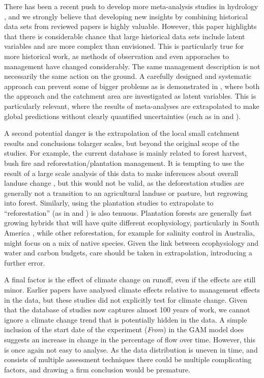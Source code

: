 \documentclass[]{elsarticle} %
\begin{document}
There has been a recent push to develop more meta-analysis studies in hydrology \citep{wang2020, evaristo2020metaanalysis}, and we strongly believe that developing new insights by combining historical data sets from reviewed papers is highly valuable. However, this paper highlights that there is considerable chance that large historical data sets include latent variables and are more complex than envisioned. This is particularly true for more historical work, as methods of observation and even apporaches to management have changed considerably. The same management description is not necessarily the same action on the ground. A carefully designed and systematic approach can prevent some of bigger problems as is demonstrated in \citet{wang2020}, where both the approach and the catchment area are investigated as latent variables.
This is particularly relevant, where the results of meta-analyses are extrapolated to make global predictions without clearly quantified uncertainties (such as in \citet{hoekvandijke2022} and \citet{wang2020}).

A second potential danger is the extrapolation of the local small catchment results and conclusions tolarger scales, but beyond the original scope of the studies. For example, the current database is mainly related to forest harvest, bush fire and reforestation/plantation management. It is tempting to use the result of a large scale analysis of this data to make inferences about overall landuse change \citep{li2017, wang2020}, but this would not be valid, as the deforestation studies are generally not a transition to an agricultural landuse or pasture, but regrowing into forest. Similarly, using the plantation studies to extrapolate to ``reforestation'' (as in \citet{filoso2017} and \citet{hoekvandijke2022}) is also tenuous. Plantation forests are generally fast growing hybrids that will have quite different ecophysiology, particularly in South America \citep{jones2017, binkley2017}, while other reforestation, for example for salinity control in Australia, might focus on a mix of native species. Given the link between ecophysiology and water and carbon budgets, care should be taken in extrapolation, introducing a further error.

A final factor is the effect of climate change \citep{vervoort2021} on runoff, even if the effects are still minor. Earlier papers \citep{li2017, wang2020} have analysed climate effects relative to management effects in the data, but these studies did not explicitly test for climate change. Given that the database of studies now captures almost 100 years of work, we cannot ignore a climate change trend that is potentially hidden in the data. A simple inclusion of the start date of the experiment (\emph{From}) in the GAM model does suggests an increase in change in the percentage of flow over time. However, this is once again not easy to analyse. As the data distribution is uneven in time, and consists of multiple assessment techniques there could be multiple complicating factors, and drawing a firm conclusion would be premature.
\end{document}
